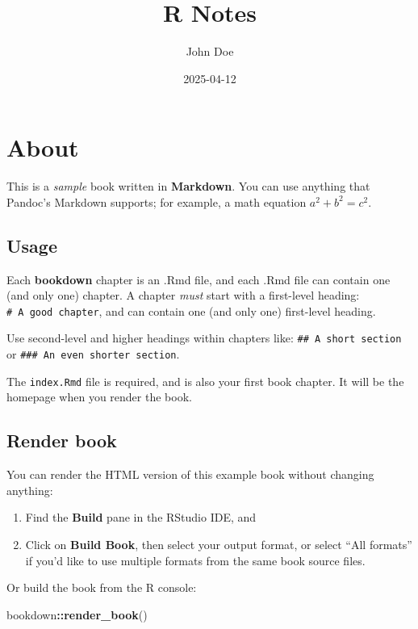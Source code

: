 \documentclass[
]{book}
\title{R Notes}
\author{John Doe}
\date{2025-04-12}
\newenvironment{Shaded}{\begin{snugshade}}{\end{snugshade}}
\newcommand{\FunctionTok}[1]{\textcolor[rgb]{0.13,0.29,0.53}{\textbf{#1}}}
\newcommand{\NormalTok}[1]{#1}
\newcommand{\SpecialCharTok}[1]{\textcolor[rgb]{0.81,0.36,0.00}{\textbf{#1}}}
\theoremstyle{definition}
\theoremstyle{definition}
\theoremstyle{definition}
\theoremstyle{definition}
\theoremstyle{remark}
\begin{document}
\maketitle

{
\setcounter{tocdepth}{1}
\tableofcontents
}
\chapter{About}\label{about}

This is a \emph{sample} book written in \textbf{Markdown}. You can use anything that Pandoc's Markdown supports; for example, a math equation \(a^2 + b^2 = c^2\).

\section{Usage}\label{usage}

Each \textbf{bookdown} chapter is an .Rmd file, and each .Rmd file can contain one (and only one) chapter. A chapter \emph{must} start with a first-level heading: \texttt{\#\ A\ good\ chapter}, and can contain one (and only one) first-level heading.

Use second-level and higher headings within chapters like: \texttt{\#\#\ A\ short\ section} or \texttt{\#\#\#\ An\ even\ shorter\ section}.

The \texttt{index.Rmd} file is required, and is also your first book chapter. It will be the homepage when you render the book.

\section{Render book}\label{render-book}

You can render the HTML version of this example book without changing anything:

\begin{enumerate}
\def\labelenumi{\arabic{enumi}.}
\item
  Find the \textbf{Build} pane in the RStudio IDE, and
\item
  Click on \textbf{Build Book}, then select your output format, or select ``All formats'' if you'd like to use multiple formats from the same book source files.
\end{enumerate}

Or build the book from the R console:

\begin{Shaded}
\begin{Highlighting}[]
\NormalTok{bookdown}\SpecialCharTok{::}\FunctionTok{render\_book}\NormalTok{()}
\end{Highlighting}
\end{Shaded}
\end{document}
